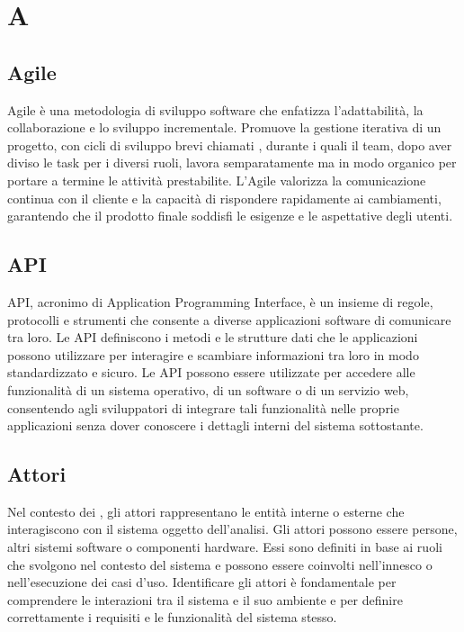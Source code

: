 \section{A}

\vspace{2em}
\subsection*{Agile}
Agile è una metodologia di sviluppo software che enfatizza l'adattabilità, la collaborazione e lo sviluppo incrementale. Promuove la gestione iterativa di un progetto, con cicli di sviluppo brevi chiamati , durante i quali il team, dopo aver diviso le task per i diversi ruoli, lavora semparatamente ma in modo organico per portare a termine le attività prestabilite. L'Agile valorizza la comunicazione continua con il cliente e la capacità di rispondere rapidamente ai cambiamenti, garantendo che il prodotto finale soddisfi le esigenze e le aspettative degli utenti.

\vspace{2em}
\subsection*{API}
API, acronimo di Application Programming Interface, è un insieme di regole, protocolli e strumenti che consente a diverse applicazioni software di comunicare tra loro. Le API definiscono i metodi e le strutture dati che le applicazioni possono utilizzare per interagire e scambiare informazioni tra loro in modo standardizzato e sicuro. Le API possono essere utilizzate per accedere alle funzionalità di un sistema operativo, di un software o di un servizio web, consentendo agli sviluppatori di integrare tali funzionalità nelle proprie applicazioni senza dover conoscere i dettagli interni del sistema sottostante.

\vspace{2em}
\subsection*{Attori}
Nel contesto dei , gli attori rappresentano le entità interne o esterne che interagiscono con il sistema oggetto dell'analisi. Gli attori possono essere persone, altri sistemi software o componenti hardware. Essi sono definiti in base ai ruoli che svolgono nel contesto del sistema e possono essere coinvolti nell'innesco o nell'esecuzione dei casi d'uso. Identificare gli attori è fondamentale per comprendere le interazioni tra il sistema e il suo ambiente e per definire correttamente i requisiti e le funzionalità del sistema stesso.
